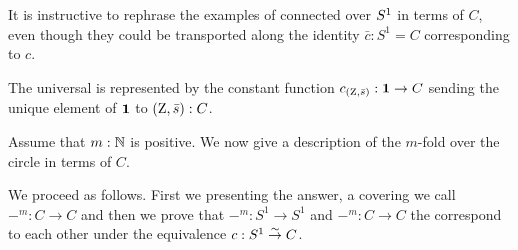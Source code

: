 It is instructive to rephrase the examples of connected \coverings over ${S^1}$ in 
terms of $C$, even though they could be transported along the identity $\bar c:S^1=C$ corresponding to $c$.

\begin{example}\label{exa:univCcover}
The universal \covering is represented by the constant function
$c_{(\mathrm{Z},\bar {s})}:\mathbf{1}\to C$ sending the unique element 
of $\mathbf{1}$ to $(\mathrm{Z},\bar {s}):C$.
\end{example}

\begin{example}\label{exa:mfoldCcover}
Assume that $m:\mathbb{N}$ is positive.  We now give a description of 
the $m$-fold \covering over the circle in terms of $C$.

We proceed as follows.  First we presenting the answer, a covering we call $-^m:C\to C$ and then we prove that $-^m:S^1\to S^1$ and $-^m:C\to C$ the  correspond to each other under the equivalence $c:S^1\overset\sim\to C$. 


\end{example}
